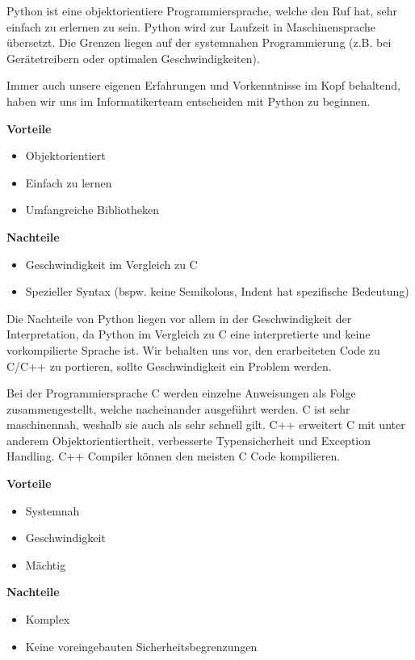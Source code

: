 \documentclass[a4paper]{report}
\begin{document}
Python ist eine objektorientiere Programmiersprache, welche den Ruf hat, sehr
einfach zu erlernen zu sein. Python wird  zur Laufzeit in Maschinensprache
übersetzt. Die Grenzen liegen auf der systemnahen Programmierung (z.B. bei
Gerätetreibern oder optimalen Geschwindigkeiten).

Immer auch unsere eigenen Erfahrungen und Vorkenntnisse im Kopf behaltend, haben wir uns im Informatikerteam entscheiden mit Python zu beginnen.

\begin{multicols}{2}
	\textbf{Vorteile}
	\begin{itemize}[label={+},noitemsep]
		\item Objektorientiert
		\item Einfach zu lernen
		\item Umfangreiche Bibliotheken\\
	\end{itemize}
	\columnbreak
	\textbf{Nachteile}
	\begin{itemize}[label={-},noitemsep]
		\item Geschwindigkeit im Vergleich zu C
		\item Spezieller Syntax (bspw. keine Semikolons, Indent hat spezifische Bedeutung)
	\end{itemize}
\end{multicols}

Die Nachteile von Python liegen vor allem in der Geschwindigkeit der Interpretation, da Python im Vergleich zu C eine interpretierte und keine vorkompilierte Sprache ist. Wir behalten uns vor, den erarbeiteten Code zu C/C++ zu portieren, sollte Geschwindigkeit ein Problem werden.

Bei der Programmiersprache C werden einzelne Anweisungen als Folge
zusammengestellt, welche nacheinander ausgeführt werden. C ist sehr
maschinennah, weshalb sie auch als sehr schnell gilt. C++ erweitert C mit unter anderem Objektorientiertheit, verbesserte Typensicherheit und Exception Handling. C++ Compiler können den meisten C Code kompilieren. \parencite{Mishra2015}

\begin{multicols}{2}
	\textbf{Vorteile}
	\begin{itemize}[label={+},noitemsep]
		\item Systemnah
		\item Geschwindigkeit
		\item Mächtig
	\end{itemize}
	\columnbreak
	\textbf{Nachteile}
	\begin{itemize}[label={-},noitemsep]
		\item Komplex
		\item Keine voreingebauten Sicherheitsbegrenzungen
	\end{itemize}
\end{multicols}
\end{document}
